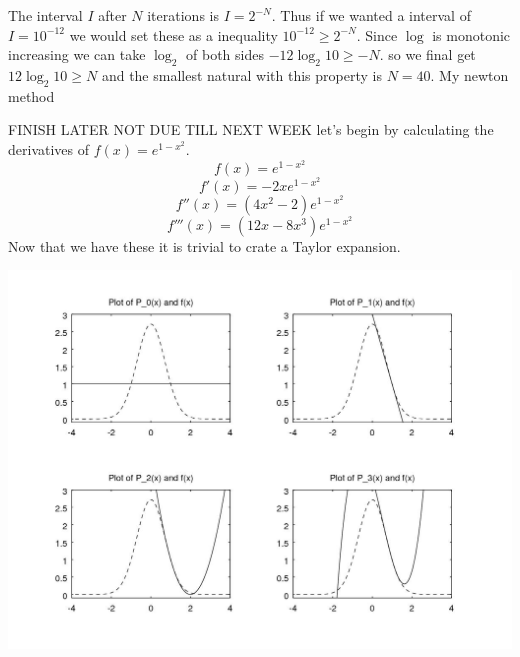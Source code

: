 \documentclass[12pt]{article}
\makeatletter
\theoremstyle{homework}
\newenvironment{exercise}[1]
{\def\@currentlabel{#1}\exercisecore}
{\endexercisecore}
\makeatother
\begin{document}
The interval $I$ after $N$ iterations is $I=2^{-N}$.  Thus if we wanted a interval of $I=10^{-12}$ we would set these as a inequality $10^{-12}\ge 2^{-N}$.  Since $\log$ is monotonic increasing we can take $\log_2$ of both sides $-12\log_2 10\ge -N$.  so we final get $12\log_2 10\ge N$ and the smallest natural with this property is $N=40$.
\newpage
\begin{exercise}{Chapter 4: 2(b)}
\end{exercise}
My newton method


FINISH LATER NOT DUE TILL NEXT WEEK
\newpage
\begin{exercise}{Chapter 4: 18}
\end{exercise}
let's begin by calculating the derivatives of $f(x)=e^{1-x^2}$.
$$f(x)=e^{1-x^2}$$
$$f'(x)=-2xe^{1-x^2}$$
$$f''(x)=(4x^2-2)e^{1-x^2}$$
$$f'''(x)=(12x-8x^3)e^{1-x^2}$$
Now that we have these it is trivial to crate a Taylor expansion.

\includegraphics[scale=.9]{../octave/q5fig.jpg}
\end{document}
